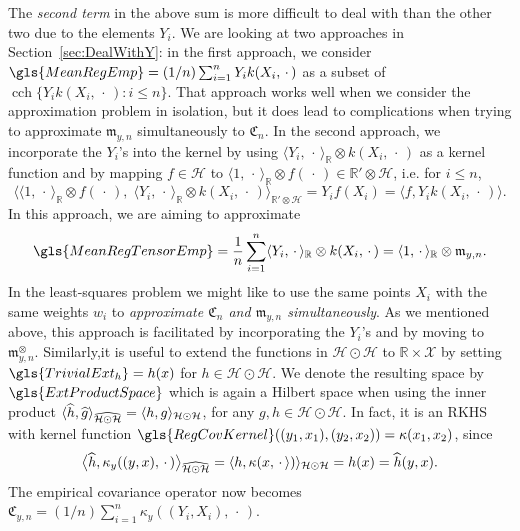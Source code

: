 \documentclass[10pt]{amsart}
\theoremstyle{definition}\newtheorem{defi}[theo]{Definition}\newtheorem{rema}[theo]{Remark}\newtheorem{exam}[theo]{Example}\newtheorem{exem}[theo]{Example}\newtheorem{nota}[theo]{Notation}
\theoremstyle{remark}
\DeclareMathOperator{\cch}{cch}
\newcommand{\R}{\mathbb{R}}
\newcommand{\dR}{{\R'}}
\newcommand{\X}{\mathcal{X}}
\newcommand{\cH}{\mathcal{H}}
\newcommand{\fkC}{\mathfrak{C}}
\newcommand{\mean}{\mathfrak{m}}
\let\oldhat\hat
\renewcommand*{\hat}[1]{\mathchoice{\widehat{#1}}{\widehat{#1}}{\oldhat{#1}}{\oldhat{#1}}}
\begin{document}
The \emph{second term} in the above sum is more difficult to deal with than the other two due to the elements $Y_i$. We are looking at two approaches in Section~\ref{sec:DealWithY}: in the first approach, we consider $\gls{MeanRegEmp} = (1/n) \sum_{i=1}^n Y_i k(X_i,\,\cdot\,)$ as a subset of $\cch \{Y_i k(X_i,\,\cdot\,) : i \leq n\}$. That approach works well when we consider the approximation problem in isolation, but it does lead to complications when trying to approximate $\mean_{y,n}$ simultaneously to $\fkC_n$. In the second approach, we incorporate the $Y_i$'s into the kernel by using $\langle Y_i, \,\cdot\, \rangle_\R \otimes k(X_i,\,\cdot\,)$ as a kernel function and by mapping $f\in \cH$ to $\langle 1,\,\cdot\, \rangle_\R \otimes f(\,\cdot\,) \in \dR \otimes \cH$, i.e. for $i\leq n$,
\[
\bigl\langle \langle 1,\,\cdot\, \rangle_\R \otimes f(\,\cdot\,),\; \langle Y_i,\,\cdot\, \rangle_\R \otimes k(X_i,\,\cdot\,) \bigr\rangle_{\dR \otimes \cH} = Y_i f(X_i) = \langle f,Y_i k(X_i,\,\cdot\,) \rangle.
\]
In this approach, we are aiming to approximate
\[
\gls{MeanRegTensorEmp} = \frac{1}{n} \sum_{i=1}^n \langle Y_i,\,\cdot\, \rangle_\R \otimes k(X_i,\,\cdot\,) = \langle 1, \,\cdot\, \rangle_\R \otimes \mean_{y,n}.
\]
In the least-squares problem we might like to use the same points $X_i$ with the same weights $w_i$ to
\emph{approximate $\fkC_n$ and $\mean_{y,n}$ simultaneously}. As we mentioned above, this approach is facilitated by incorporating the $Y_i$'s and by moving to $\mean_{y,n}^\otimes$. Similarly,\linebreak it is useful to extend the functions in $\cH \odot \cH$ to $\R \times \X$ by setting $\gls{TrivialExt_h} = h(x)$ for $h\in \cH \odot \cH$. We denote the resulting space by $\gls{ExtProductSpace}$ which is again a Hilbert space when using the inner product $\langle \hat h, \hat g \rangle_{\widehat{\cH \odot \cH}} = \langle h, g \rangle_{\cH \odot \cH}$, for any $g,h \in \cH \odot \cH$. In fact, it is an RKHS with kernel function $\gls{RegCovKernel}((y_1,x_1),(y_2,x_2)) = \kappa(x_1,x_2)$, since
\[
\bigl\langle \hat h, \kappa_y((y,x),\,\cdot\,)
\bigr\rangle_{\widehat{\cH \odot \cH} } = \langle h, \kappa(x, \,\cdot\, \rangle) \rangle_{\cH \odot \cH} = h(x) = \hat h(y,x).
\]
The empirical covariance operator now becomes $\fkC_{y,n} = (1/n) \sum_{i=1}^n \kappa_y((Y_i, X_i), \,\cdot\,)$.
\end{document}
